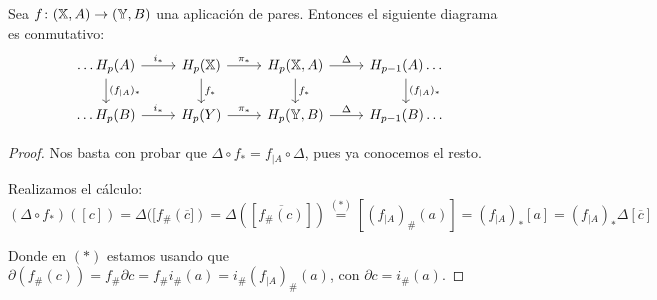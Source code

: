 \begin{proposition}
  Sea $f \colon ({\mathbb X}, A) \to ({\mathbb Y}, B)$ una aplicación de pares. Entonces el siguiente diagrama es conmutativo:
  \[  \begin{tikzcd}
    \dots H_p(A) \arrow{r}{i_*} \arrow{d}{(f_{|A})_*} & H_p(\X) \arrow{r}{\pi_*} \arrow{d}{f_*} & H_p(\X, A) \arrow{r}{\Delta} \arrow{d}{f_*} & H_{p-1}(A) \dots \arrow{d}{(f_{|A})_*} \\
    \dots H_p(B) \arrow{r}{i_*} & H_p(Y) \arrow{r}{\pi_*} & H_p(\Y, B) \arrow{r}{\Delta} & H_{p-1}(B) \dots
  \end{tikzcd} \]
\end{proposition}

\begin{proof}
  Nos basta con probar que $\Delta \circ f_* = f_{|A} \circ \Delta$, pues ya conocemos el resto.

  Realizamos el cálculo:
  \[ (\Delta \circ f_*)([c]) = \Delta([f_\#(\overline{c}]) = \Delta([\overline{f_\#(c)}]) \stackrel{(*)}{=} [(f_{|A})_\#(a)]
    = (f_{|A})_*[a] = (f_{|A})_* \Delta[\overline{c}] \]

  Donde en $(*)$ estamos usando que $\partial(f_\#(c)) = f_\# \partial c = f_\# i_\#(a) = i_\#(f_{|A})_\#(a)$, con $\partial c = i_\#(a).$
\end{proof}
